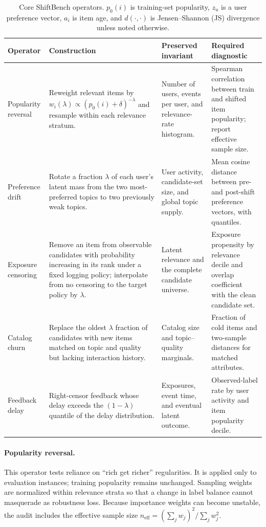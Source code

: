 \begin{table}[t]
  \caption{Core ShiftBench operators.  $p_0(i)$ is training-set popularity,
  $z_u$ is a user preference vector, $a_i$ is item age, and $d(\cdot,\cdot)$ is
  Jensen--Shannon (JS) divergence unless noted otherwise.}
  \label{tab:operators}
  \small
  \begin{tabular}{p{}p{}p{}p{}}
    \toprule
    Operator & Construction & Preserved invariant & Required diagnostic \\
    \midrule
    Popularity reversal & Reweight relevant items by
      $w_i(\lambda)\propto(p_0(i)+\delta)^{-\lambda}$ and resample within each
      relevance stratum. & Number of users, events per user, and relevance-rate
      histogram. & Spearman correlation between train and shifted item
      popularity; report effective sample size. \\
    Preference drift & Rotate a fraction $\lambda$ of each user's latent mass
      from the two most-preferred topics to two previously weak topics. & User
      activity, candidate-set size, and global topic supply. & Mean cosine
      distance between pre- and post-shift preference vectors, with quantiles. \\
    Exposure censoring & Remove an item from observable candidates with
      probability increasing in its rank under a fixed logging policy; interpolate
      from no censoring to the target policy by $\lambda$. & Latent relevance and
      the complete candidate universe. & Exposure propensity by relevance decile
      and overlap coefficient with the clean candidate set. \\
    Catalog churn & Replace the oldest $\lambda$ fraction of candidates with new
      items matched on topic and quality but lacking interaction history. &
      Catalog size and topic--quality marginals. & Fraction of cold items and
      two-sample distances for matched attributes. \\
    Feedback delay & Right-censor feedback whose delay exceeds the
      $(1-\lambda)$ quantile of the delay distribution. & Exposures, event time,
      and eventual latent outcome. & Observed-label rate by user activity and
      item popularity decile. \\
    \bottomrule
  \end{tabular}
\end{table}

\paragraph{Popularity reversal.}
This operator tests reliance on ``rich get richer'' regularities.  It is applied
only to evaluation instances; training popularity remains unchanged.  Sampling
weights are normalized within relevance strata so that a change in label balance
cannot masquerade as robustness loss.  Because importance weights can become
unstable, the audit includes the effective sample size
$n_{\mathrm{eff}}=(\sum_j w_j)^2/\sum_jw_j^2$.

